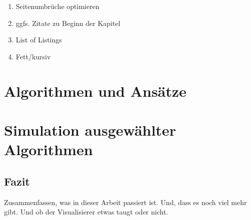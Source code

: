 
\listfiles


\listoftodos

\begin{enumerate}
	\item Seitenumbrüche optimieren
	\item ggfs. Zitate zu Beginn der Kapitel
	\item List of Listings
	\item Fett/kursiv
\end{enumerate}



\cleardoublepage

\setcounter{page}{1}
\pagestyle{maincontentstyle}


\part{Algorithmen und Ansätze}






\part{Simulation ausgewählter Algorithmen}


\cleardoublepage

\chapter{Fazit}
Zusammenfassen, was in dieser Arbeit passiert ist.
Und, dass es noch viel mehr gibt.
Und ob der Visualisierer etwas taugt oder nicht.




